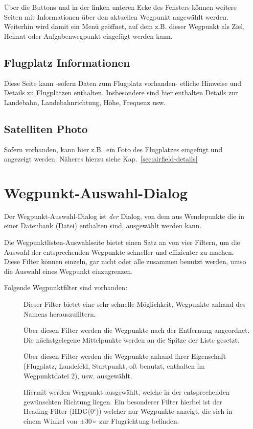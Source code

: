 Über die Buttons \button{$<$} und \button{$>$} in der linken unteren Ecke des Fensters können weitere Seiten mit Informationen über den aktuellen Wegpunkt angewählt werden. Weiterhin wird damit ein Menü geöffnet, auf dem z.B. dieser Wegpunkt als Ziel, Heimat oder Aufgabenwegpunkt eingefügt werden kann.


\subsection*{Flugplatz Informationen}
Diese Seite kann -sofern Daten zum Flugplatz vorhanden- etliche Hinweise und Details zu Flugplätzen enthalten. 
Insbesondere sind hier enthalten Details zur Landebahn, Landebahnrichtung, Höhe, Frequenz usw.


\subsection*{Satelliten Photo}
Sofern vorhanden, kann hier z.B.\ ein Foto des Flugplatzes eingefügt und angezeigt werden. 
Näheres hierzu siehe Kap.~\ref{sec:airfield-details} 


\section{Wegpunkt-Auswahl-Dialog}\label{sec:waypoint-selector-dialog}
Der Wegpunkt-Auswahl-Dialog ist \textsl{der} Dialog, von dem aus Wendepunkte die in einer Datenbank (Datei) enthalten sind, ausgewählt werden kann.

Die Wegpunktlisten-Auswahlseite bietet einen Satz an von vier Filtern, um die Auswahl der entsprechenden  Wegpunkte schneller und effizienter zu machen. Diese Filter können einzeln, gar nicht oder alle zusammen benutzt werden, umso die Auswahl eines Wegpunkt  einzugrenzen.

Folgende Wegpunktfilter sind vorhanden:

\begin{description}
\item[] Dieser Filter bietet eine sehr schnelle Möglichkeit, Wegpunkte anhand des Namens herauszufiltern.
\item[] Über diesen Filter werden die Wegpunkte nach der Entfernung angeordnet. Die nächstgelegene 
Mittelpunkte werden an die Spitze der Liste gesetzt.
\item[] Über diesen Filter werden die Wegpunkte anhand ihrer Eigenschaft (Flugplatz, Landefeld, Startpunkt, oft benutzt, enthalten im Wegpunktdatei 2), usw. ausgewählt.
\item[] Hiermit werden Wegpunkt ausgewählt, welche in der entsprechenden gewünschten Richtung liegen. Ein besonderer Filter hierbei ist der Heading-Filter (\textsf{HDG(0$^\circ$)}) welcher nur Wegpunkte anzeigt, die sich in einem Winkel von $\pm 30\circ$ zur Flugrichtung befinden.
\end{description}

